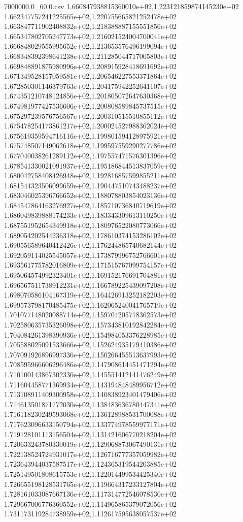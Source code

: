 \begin{filecontents*}{7000000.0_60.0.csv}
1.660847938815360010e+02,1.223121859874145230e+02
1.662347757241225565e+02,1.220755665821252478e+02
1.663847711902408832e+02,1.218388887155551856e+02
1.665347802705247773e+02,1.216021524004700041e+02
1.666848029555995652e+02,1.213653576496199094e+02
1.668348392398641238e+02,1.211285044717005803e+02
1.669848891875980996e+02,1.208915928418691692e+02
1.671349528157059581e+02,1.206546227553371864e+02
1.672850301146379763e+02,1.204175942252641107e+02
1.674351210748124856e+02,1.201805072647630368e+02
1.674981977427536606e+02,1.200808589845737515e+02
1.675297239576756567e+02,1.200310515510855112e+02
1.675478254173861217e+02,1.200024527988362024e+02
1.675619359594716116e+02,1.199801594128975921e+02
1.675748507149062618e+02,1.199597559290277786e+02
1.677040038261289112e+02,1.197557471576301396e+02
1.678541330021091937e+02,1.195186844513837059e+02
1.680042758408426948e+02,1.192816857599855211e+02
1.681544323506099659e+02,1.190447510743488237e+02
1.683046025396766652e+02,1.188078803854023136e+02
1.684547864163276927e+02,1.185710736840719619e+02
1.686049839888174233e+02,1.183343309613110250e+02
1.687551952654349918e+02,1.180976522080773066e+02
1.689054202544236318e+02,1.178610374153286102e+02
1.690556589640412426e+02,1.176244865740682144e+02
1.692059114025545057e+02,1.173879996752766601e+02
1.693561775782016809e+02,1.171515767099754157e+02
1.695064574992323401e+02,1.169152176691704881e+02
1.696567511738912231e+02,1.166789225439097208e+02
1.698070586104167319e+02,1.164426913252182203e+02
1.699573798170485475e+02,1.162065240041765719e+02
1.701077148020088714e+02,1.159704205718362573e+02
1.702580635735326098e+02,1.157343810192842284e+02
1.704084261398390936e+02,1.154984053376228985e+02
1.705588025091533666e+02,1.152624935179410386e+02
1.707091926896997336e+02,1.150266455513637993e+02
1.708595966606296486e+02,1.147908614451471294e+02
1.710100143867302336e+02,1.145551412141476249e+02
1.711604458771369934e+02,1.143194848489956712e+02
1.713108911409300958e+02,1.140838923401479406e+02
1.714613501871772030e+02,1.138483636780447341e+02
1.716118230249593068e+02,1.136128988531700088e+02
1.717623096633150794e+02,1.133774978559977171e+02
1.719128101113156504e+02,1.131421606770218204e+02
1.720633243780330019e+02,1.129068873067490131e+02
1.722138524724931017e+02,1.126716777357059982e+02
1.723643944037587517e+02,1.124365319544203885e+02
1.725149501808615753e+02,1.122014499534425340e+02
1.726655198128531765e+02,1.119664317233127804e+02
1.728161033087667136e+02,1.117314772546078530e+02
1.729667006776360552e+02,1.114965865379072056e+02
1.731173119284738959e+02,1.112617595638057537e+02

\end{filecontents*}
